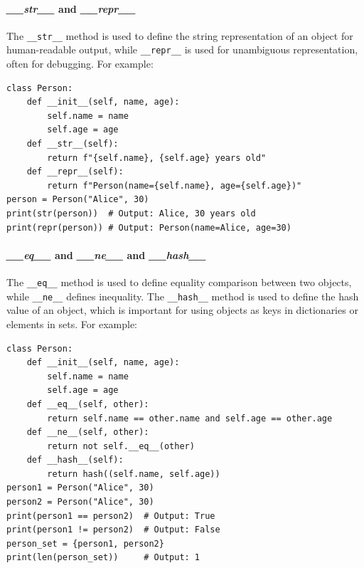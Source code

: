 \noindent\makebox[\linewidth]{\rule{\paperwidth}{0.4pt}}

\paragraph{\textit{\_\_str\_\_} and \textit{\_\_repr\_\_}}
The \texttt{\_\_str\_\_} method is used to define the string representation of an object for human-readable output, while \texttt{\_\_repr\_\_} is used for unambiguous representation, often for debugging. For example:
\begin{lstlisting}[caption=\texttt{\_\_str\_\_} and \texttt{\_\_repr\_\_} Example]
class Person:
    def __init__(self, name, age):
        self.name = name
        self.age = age
    def __str__(self):
        return f"{self.name}, {self.age} years old"
    def __repr__(self):
        return f"Person(name={self.name}, age={self.age})"
person = Person("Alice", 30)
print(str(person))  # Output: Alice, 30 years old
print(repr(person)) # Output: Person(name=Alice, age=30)
\end{lstlisting}

\paragraph{\textit{\_\_eq\_\_} and \textit{\_\_ne\_\_} and \textit{\_\_hash\_\_}}
The \texttt{\_\_eq\_\_} method is used to define equality comparison between two objects, while \texttt{\_\_ne\_\_} defines inequality. The \texttt{\_\_hash\_\_} method is used to define the hash value of an object, which is important for using objects as keys in dictionaries or elements in sets. For example:
\begin{lstlisting}[caption=\texttt{\_\_eq\_\_}\, \texttt{\_\_ne\_\_} and \texttt{\_\_hash\_\_} Example]
class Person:
    def __init__(self, name, age):
        self.name = name
        self.age = age
    def __eq__(self, other):
        return self.name == other.name and self.age == other.age
    def __ne__(self, other):
        return not self.__eq__(other)
    def __hash__(self):
        return hash((self.name, self.age))
person1 = Person("Alice", 30)
person2 = Person("Alice", 30)
print(person1 == person2)  # Output: True
print(person1 != person2)  # Output: False
person_set = {person1, person2}
print(len(person_set))     # Output: 1
\end{lstlisting}

